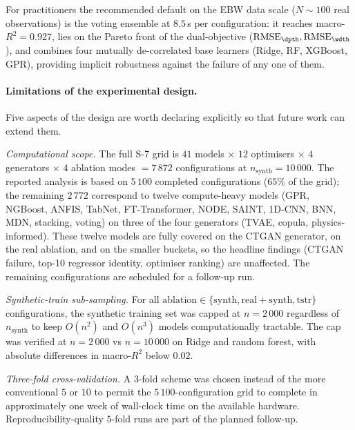 For practitioners the recommended default on the EBW data scale ($N \sim 100$ real observations) is the voting ensemble at $8.5$\,\si{\second} per configuration: it reaches macro-$R^{2} = 0.927$, lies on the Pareto front of the dual-objective ($\mathrm{RMSE}_{\dpth}, \mathrm{RMSE}_{\wdth}$), and combines four mutually de-correlated base learners (Ridge, RF, XGBoost, GPR), providing implicit robustness against the failure of any one of them.



\paragraph{Limitations of the experimental design.} Five aspects of the design are worth declaring explicitly so that future work can extend them.

\textit{Computational scope.} The full S-7 grid is $41$ models $\times$ $12$ optimisers $\times$ $4$ generators $\times$ $4$ ablation modes $= 7\,872$ configurations at $n_{\mathrm{synth}} = 10\,000$. The reported analysis is based on $5\,100$ completed configurations ($65\%$ of the grid); the remaining $2\,772$ correspond to twelve compute-heavy models (GPR, NGBoost, ANFIS, TabNet, FT-Transformer, NODE, SAINT, 1D-CNN, BNN, MDN, stacking, voting) on three of the four generators (TVAE, copula, physics-informed). These twelve models are fully covered on the CTGAN generator, on the real ablation, and on the smaller buckets, so the headline findings (CTGAN failure, top-10 regressor identity, optimiser ranking) are unaffected. The remaining configurations are scheduled for a follow-up run.

\textit{Synthetic-train sub-sampling.} For all $\mathrm{ablation} \in \{\mathrm{synth}, \mathrm{real+synth}, \mathrm{tstr}\}$ configurations, the synthetic training set was capped at $n = 2\,000$ regardless of $n_{\mathrm{synth}}$ to keep $O(n^{2})$ and $O(n^{3})$ models computationally tractable. The cap was verified at $n = 2\,000$ vs $n = 10\,000$ on Ridge and random forest, with absolute differences in macro-$R^{2}$ below $0.02$.

\textit{Three-fold cross-validation.} A $3$-fold scheme was chosen instead of the more conventional $5$ or $10$ to permit the $5\,100$-configuration grid to complete in approximately one week of wall-clock time on the available hardware. Reproducibility-quality $5$-fold runs are part of the planned follow-up.

